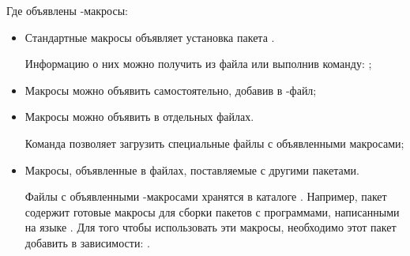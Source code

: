 Где объявлены -макросы:
\begin{itemize}
	\item Стандартные макросы объявляет установка пакета .
	 
	 Информацию о них можно получить из файла  или выполнив команду: ;
	 
	 \item Макросы можно объявить самостоятельно, добавив в -файл;
	 
	 \item Макросы можно объявить в отдельных файлах.
	 
	 Команда  позволяет загрузить специальные файлы с объявленными макросами;
	 
	 \item Макросы, объявленные в файлах, поставляемые с другими пакетами.
	 
	 Файлы с объявленными -макросами хранятся в каталоге .
	 Например, пакет  содержит готовые макросы для сборки пакетов с программами, написанными на языке .
	 Для того чтобы использовать эти макросы, необходимо этот пакет добавить в зависимости:
	 .
\end{itemize}




